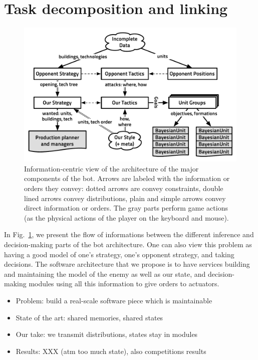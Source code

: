 \section{Task decomposition and linking}
\begin{figure}[!ht]
\begin{center}
\includegraphics[width=13cm]{images/starcraft_bbq_concept.pdf}
\end{center}
\label{fig:conceptbbq}
\caption{Information-centric view of the architecture of the major components of the bot. Arrows are labeled with the information or orders they convey: dotted arrows are convey constraints, double lined arrows convey distributions, plain and simple arrows convey direct information or orders. The gray parts perform game actions (as the physical actions of the player on the keyboard and mouse).}
\end{figure}

In Fig.~\ref{fig:conceptbbq}, we present the flow of informations between the different inference and decision-making parts of the bot architecture. One can also view this problem as having a good model of one's strategy, one's opponent strategy, and taking decisions. The software architecture that we propose is to have services building and maintaining the model of the enemy as well as our state, and decision-making modules using all this information to give orders to actuators.

\begin{itemize}
\item Problem: build a real-scale software piece which is maintainable
\item State of the art: shared memories, shared states
\item Our take: we transmit distributions, states stay in modules
\item Results: XXX (atm too much state), also competitions results
\end{itemize}

